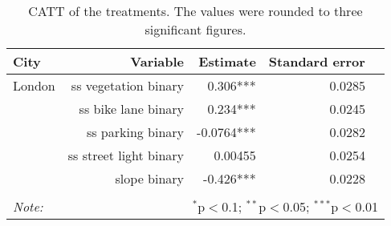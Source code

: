 \begin{table}[!htp]\centering
\caption{CATT of the treatments. The values were rounded to three significant figures.}\label{result:tab:cf}
\scriptsize
\begin{tabular}{lrrrr}\toprule
City&Variable&Estimate &Standard error \\ \midrule
London & ss vegetation binary & 0.306*** & 0.0285 \\
 & ss bike lane binary & 0.234*** & 0.0245 \\
 & ss parking binary & -0.0764*** & 0.0282 \\
 & ss street light binary & 0.00455 & 0.0254 \\
 & slope binary & -0.426*** & 0.0228 \\
\hline
\hline \\[-1.8ex]
\textit{Note:}  & \multicolumn{5}{r}{$^{*}$p$<$0.1; $^{**}$p$<$0.05; $^{***}$p$<$0.01} \\
\end{tabular}
\end{table}
